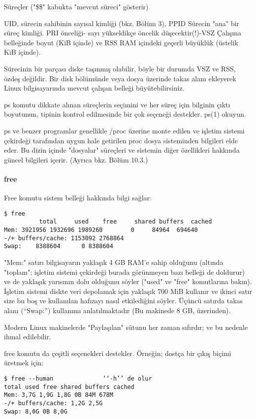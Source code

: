\begin{section}{Süreçler}
("\$\$" kabukta "mevcut süreci" gösterir)

UID, sürecin sahibinin sayısal kimliği (bkz. Bölüm 3), PPID Sürecin "ana" bir süreç kimliği. PRI önceliği- sayı yükseldikçe öncelik düşecektir(!)-VSZ Çalışma belleğinde boyut (KiB içinde) ve RSS RAM içindeki geçerli büyüklük (üstelik KiB içinde).

Sürecinin bir parçası diske taşınmış olabilir, böyle bir durumda VSZ ve RSS, özdeş değildir. Bir disk bölümünde veya dosya üzerinde takas alanı ekleyerek Linux bilgisayarında mevcut çalışan belleği büyütebilirsiniz. 

ps komutu dikkate alınan süreçlerin seçimini ve her süreç için bilginin çıktı boyutunun, tipinin kontrol edilmesinde bir çok seçeneği destekler. ps(1) okuyun.

ps ve benzer programlar genellikle /proc üzerine monte edilen ve işletim sistemi çekirdeği tarafından uygun hale getirilen proc dosya sisteminden bilgileri elde eder. Bu dizin içinde "dosyalar" süreçleri ve sistemin diğer özellikleri hakkında güncel bilgileri içerir. (Ayrıca bkz. Bölüm 10.3.)
\paragraph{free}{Free komutu sistem belleği hakkında bilgi sağlar:
\begin{verbatim}
$ free
          total     used    free     shared buffers  cached
Mem: 3921956 1932696 1989260        0     84964  694640 
-/+ buffers/cache: 1153092 2768864
Swap:    8388604      0 8388604
\end{verbatim}
}

"Mem:" satırı bilgisayarın yaklaşık 4 GB RAM'e sahip olduğunu (altında "toplam"; işletim sistemi çekirdeği burada görünmeyen bazı belleği de doldurur) ve de yaklaşık yarısının dolu olduğunu söyler ("used" ve "free" komutlarına bakın). İşletim sistemi diskte veri depolamak için yaklaşık 700 MiB kullanır ve ikinci satır size bu boş ve kullanılan hafızayı nasıl etkilediğini söyler. Üçüncü satırda takas alanı (“Swap:”) kullanımı anlatılmaktadır (Bu makinede 8 GB, üzerinden).

Modern Linux makinelerde "Paylaşılan" sütunu her zaman sıfırdır; ve bu nedenle ihmal edilebilir.

free komutu da çeşitli seçenekleri destekler. Örneğin; dostça bir çıkış biçimi üretmek için:
\begin{verbatim}
$ free --human 				‘‘-h’’ de olur
total used free shared buffers cached
Mem: 3,7G 1,9G 1,8G 0B 84M 678M
-/+ buffers/cache: 1,2G 2,5G
Swap: 8,0G 0B 8,0G
\end{verbatim}


\end{section}
